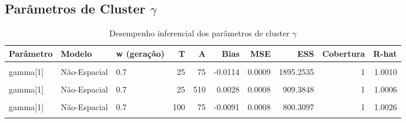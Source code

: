 \documentclass[
]{article}
\begin{document}
\subsection{\texorpdfstring{Parâmetros de Cluster
\(\gamma\)}{Parâmetros de Cluster \textbackslash gamma}}\label{paruxe2metros-de-cluster-gamma}

\begingroup\fontsize{9}{11}\selectfont

\begin{longtable}[t]{lllrrrrrrr}
\caption{\label{tab:tab-gamma}Desempenho inferencial dos parâmetros de cluster $\gamma$}\\
\toprule
Parâmetro & Modelo & w (geração) & T & A & Bias & MSE & ESS & Cobertura & R-hat\\
\midrule
\cellcolor{gray!10}{gamma[1]} & \cellcolor{gray!10}{Espacial} & \cellcolor{gray!10}{0.7} & \cellcolor{gray!10}{25} & \cellcolor{gray!10}{75} & \cellcolor{gray!10}{0.0010} & \cellcolor{gray!10}{0.0008} & \cellcolor{gray!10}{1302.8556} & \cellcolor{gray!10}{1} & \cellcolor{gray!10}{1.0119}\\
\cmidrule{1-10}\pagebreak[0]
gamma[1] & Não-Espacial & 0.7 & 25 & 75 & -0.0114 & 0.0009 & 1895.2535 & 1 & 1.0010\\
\cmidrule{1-10}\pagebreak[0]
\cellcolor{gray!10}{gamma[1]} & \cellcolor{gray!10}{Espacial} & \cellcolor{gray!10}{0.7} & \cellcolor{gray!10}{25} & \cellcolor{gray!10}{510} & \cellcolor{gray!10}{0.0199} & \cellcolor{gray!10}{0.0010} & \cellcolor{gray!10}{431.9330} & \cellcolor{gray!10}{1} & \cellcolor{gray!10}{1.0170}\\
\cmidrule{1-10}\pagebreak[0]
gamma[1] & Não-Espacial & 0.7 & 25 & 510 & 0.0028 & 0.0008 & 909.3848 & 1 & 1.0006\\
\cmidrule{1-10}\pagebreak[0]
\cellcolor{gray!10}{gamma[1]} & \cellcolor{gray!10}{Espacial} & \cellcolor{gray!10}{0.7} & \cellcolor{gray!10}{100} & \cellcolor{gray!10}{75} & \cellcolor{gray!10}{-0.0063} & \cellcolor{gray!10}{0.0008} & \cellcolor{gray!10}{627.1785} & \cellcolor{gray!10}{1} & \cellcolor{gray!10}{1.0002}\\
\cmidrule{1-10}\pagebreak[0]
gamma[1] & Não-Espacial & 0.7 & 100 & 75 & -0.0091 & 0.0008 & 800.3097 & 1 & 1.0026\\
\cmidrule{1-10}\pagebreak[0]
\cellcolor{gray!10}{gamma[1]} & \cellcolor{gray!10}{Espacial} & \cellcolor{gray!10}{0.7} & \cellcolor{gray!10}{100} & \cellcolor{gray!10}{510} & \cellcolor{gray!10}{0.0212} & \cellcolor{gray!10}{0.0010} & \cellcolor{gray!10}{249.6766} & \cellcolor{gray!10}{1} & \cellcolor{gray!10}{1.0002}\\

\end{longtable}
\end{document}
